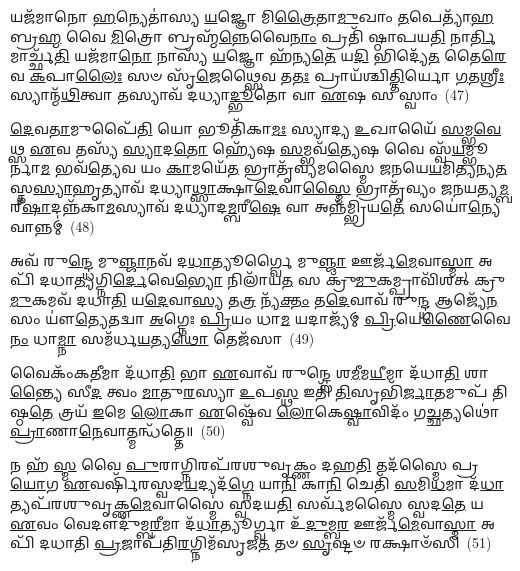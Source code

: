 𑌯𑌜᳴𑌮𑌾𑌨𑍋 \ul{𑌹}\-𑌨𑍍𑌯𑍇𑌤𑌾॑𑌸𑍍𑌯 \ul{𑌯}\-𑌜𑍍𑌞𑍋 𑌮𑌿\-\ul{𑌤𑍍𑌰𑍈}\-𑌤𑌾\-\ul{𑌮𑍁}\-𑌖𑌾𑌂 \ul{𑌤}\-𑌪𑍇𑌤𑍍𑌯𑌾᳴\-\ul{𑌹} 𑌬𑍍𑌰\-\ul{𑌹𑍍𑌮} 𑌵𑍈 \ul{𑌮𑌿}\-𑌤𑍍𑌰𑍋 𑌬𑍍𑌰𑌹𑍍𑌮᳴\-\ul{𑌨𑍍𑌨𑍇}\-𑌵𑍈\-\ul{𑌨𑌾𑌂} 𑌪𑍍𑌰𑌤𑌿᳴ 𑌷𑍍𑌠𑌾𑌪𑌯\-\ul{𑌤𑌿} 𑌨𑌾\-\ul{𑌰𑍍𑌤𑌿}\-𑌮𑌾𑌰𑍍𑌚𑍍𑌛᳴\-\ul{𑌤𑌿} 𑌯𑌜᳴𑌮𑌾\-\ul{𑌨𑍋} 𑌨𑌾𑌸𑍍𑌯᳴ \ul{𑌯}\-𑌜𑍍𑌞𑍋 𑌹᳴𑌨𑍍𑌯\-\ul{𑌤𑍇} 𑌯\-\ul{𑌦𑌿} 𑌭𑌿𑌦𑍍𑌯𑍇᳴\-\ul{𑌤} 𑌤𑍈\-\ul{𑌰𑍇}\-𑌵 \ul{𑌕}\-𑌪𑌾\-\ul{𑌲𑍈𑌃} 𑌸𑍞 𑌸𑍃᳴\-\ul{𑌜𑍇}\-𑌥𑍍𑌸𑍈𑌵 𑌤\-\ul{𑌤𑌃} 𑌪𑍍𑌰𑌾𑌯᳴𑌶𑍍𑌚𑌿\-\ul{𑌤𑍍𑌤𑌿}\-𑌰𑍍𑌯𑍋 \ul{𑌗}\-𑌤\-\ul{𑌶𑍍𑌰𑍀𑌃} 𑌸𑍍𑌯𑌾𑌨𑍍𑌮᳴\-\ul{𑌥𑌿}\-𑌤𑍍𑌵𑌾 𑌤𑌸𑍍𑌯𑌾𑌵᳴ 𑌦𑌧𑍍𑌯𑌾\-\ul{𑌦𑍍𑌭𑍂}\-𑌤𑍋 𑌵𑌾 \ul{𑌏}\-𑌷 𑌸 𑌸𑍍𑌵𑌾𑌂~(47)

\-\ul{𑌦𑍇}\-𑌵\-\ul{𑌤𑌾}\-𑌮𑍁𑌪𑍈᳴\-\ul{𑌤𑌿} 𑌯𑍋 𑌭𑍂𑌤𑌿᳴𑌕𑌾\-\ul{𑌮𑌃} 𑌸𑍍𑌯𑌾𑌦𑍍𑌯 \ul{𑌉}\-𑌖𑌾𑌯𑍈᳴ \ul{𑌸}\-𑌮𑍍𑌭\-\ul{𑌵𑍇}\-𑌥𑍍𑌸 \ul{𑌏}\-𑌵 𑌤𑌸𑍍𑌯᳴ \ul{𑌸𑍍𑌯𑌾}\-𑌦\-\ul{𑌤𑍋} 𑌹𑍍𑌯𑍇᳴𑌷 \ul{𑌸}\-𑌮𑍍𑌭𑌵᳴\-\ul{𑌤𑍍𑌯𑍇}\-𑌷 𑌵𑍈 𑌸𑍍𑌵᳴\-\ul{𑌯}\-𑌮𑍍𑌭𑍂𑌰𑍍𑌨𑌾\-\ul{𑌮} 𑌭𑌵᳴\-\ul{𑌤𑍍𑌯𑍇}\-𑌵 𑌯𑌂 \ul{𑌕𑌾}\-𑌮𑌯𑍇᳴\-\ul{𑌤} 𑌭𑍍𑌰𑌾𑌤𑍃᳴𑌵𑍍𑌯𑌮𑌸𑍍𑌮𑍈 𑌜𑌨𑌯𑍇\-\ul{𑌯}\-𑌮𑌿\-\ul{𑌤𑍍𑌯}\-𑌨𑍍𑌯\-\ul{𑌤}\-𑌸𑍍𑌤\-\ul{𑌸𑍍𑌯𑌾}\-𑌹𑍃𑌤𑍍𑌯𑌾𑌵᳴ 𑌦𑌧𑍍𑌯𑌾\-\ul{𑌥𑍍𑌸𑌾}\-𑌕𑍍𑌷𑌾\-\ul{𑌦𑍇}\-𑌵𑌾\-\ul{𑌸𑍍𑌮𑍈} 𑌭𑍍𑌰𑌾𑌤𑍃᳴𑌵𑍍𑌯𑌂 𑌜𑌨𑌯𑌤𑍍𑌯\-\ul{𑌮𑍍𑌬}\-𑌰𑍀\-\ul{𑌷𑌾}\-\-𑌦𑌨𑍍𑌨᳴𑌕𑌾\-\ul{𑌮}\-𑌸𑍍𑌯𑌾𑌵᳴ 𑌦𑌧𑍍𑌯𑌾𑌦\-\ul{𑌮𑍍𑌬}\-𑌰𑍀\-\ul{𑌷𑍇} 𑌵𑌾 𑌅𑌨𑍍𑌨᳴𑌮𑍍𑌭𑍍𑌰𑌿𑌯\-\ul{𑌤𑍇} 𑌸𑌯𑍋॑\-\ul{𑌨𑍍𑌯𑍇}\-𑌵𑌾𑌨𑍍𑌨𑌮𑍍॑~(48)

𑌅𑌵᳴ 𑌰𑍁\-\ul{𑌨𑍍𑌦𑍍𑌧𑍇} 𑌮𑍁\-\ul{𑌞𑍍𑌜𑌾}\-𑌨𑌵᳴ 𑌦\-\ul{𑌧𑌾}\-𑌤𑍍𑌯𑍂𑌰𑍍𑌗𑍍𑌵𑍈 𑌮𑍁\-\ul{𑌞𑍍𑌜𑌾} 𑌊𑌰𑍍𑌜᳴\-\ul{𑌮𑍇}\-𑌵𑌾\-\ul{𑌸𑍍𑌮𑌾} 𑌅𑌪𑌿᳴ 𑌦𑌧𑌾\-\ul{𑌤𑍍𑌯}\-𑌗𑍍𑌨𑌿\-\ul{𑌰𑍍𑌦𑍇}\-𑌵𑍇\-\ul{𑌭𑍍𑌯𑍋} 𑌨𑌿𑌲𑌾᳴𑌯\-\ul{𑌤} 𑌸 𑌕𑍍𑌰𑍁᳴\-\ul{𑌮𑍁}\-𑌕𑌮𑍍𑌪𑍍𑌰𑌾𑌵𑌿᳴𑌶𑌤𑍍 𑌕𑍍𑌰𑍁\-\ul{𑌮𑍁}\-𑌕𑌮𑌵᳴ 𑌦𑌧𑌾\-\ul{𑌤𑌿} 𑌯\-\ul{𑌦𑍇}\-𑌵𑌾\-\ul{𑌸𑍍𑌯} 𑌤\-\ul{𑌤𑍍𑌰} 𑌨𑍍𑌯᳴\-\ul{𑌕𑍍𑌤𑌂} 𑌤\-\ul{𑌦𑍇}\-𑌵𑌾𑌵᳴ 𑌰𑍁\-\ul{𑌨𑍍𑌦𑍍𑌧} 𑌆𑌜𑍍𑌯𑍇᳴\-\ul{𑌨} 𑌸𑌂 𑌯𑍗॑\-\ul{𑌤𑍍𑌯𑍇}\-𑌤𑌦𑍍𑌵𑌾 \ul{𑌅}\-𑌗𑍍𑌨𑍇𑌃 \ul{𑌪𑍍𑌰𑌿}\-𑌯𑌂 𑌧𑌾\-\ul{𑌮} 𑌯𑌦𑌾𑌜𑍍𑌯᳴𑌮𑍍 \ul{𑌪𑍍𑌰𑌿}\-𑌯𑍇\-\ul{𑌣𑍈}\-𑌵𑍈\-\ul{𑌨𑌂} 𑌧𑌾\-\ul{𑌮𑍍𑌨𑌾} 𑌸𑌮᳴𑌰𑍍𑌧\-\ul{𑌯}\-𑌤𑍍𑌯\-\ul{𑌥𑍋} 𑌤𑍇𑌜᳴𑌸𑌾~(49)

𑌵𑍈𑌕𑌂᳴𑌕\-\ul{𑌤𑍀}\-𑌮𑌾 𑌦᳴𑌧𑌾\-\ul{𑌤𑌿} 𑌭𑌾 \ul{𑌏}\-𑌵𑌾𑌵᳴ 𑌰𑍁𑌨𑍍𑌦𑍍𑌧𑍇 𑌶\-\ul{𑌮𑍀}\-𑌮\-\ul{𑌯𑍀}\-𑌮𑌾 𑌦᳴𑌧𑌾\-\ul{𑌤𑌿} 𑌶𑌾\-\ul{𑌨𑍍𑌤𑍍𑌯𑍈} 𑌸𑍀\-\ul{𑌦} 𑌤𑍍𑌵𑌂 \ul{𑌮𑌾}\-𑌤𑍁\-\ul{𑌰}\-𑌸𑍍𑌯𑌾 \ul{𑌉}\-𑌪\-\ul{𑌸𑍍𑌥} 𑌇𑌤𑌿᳴ \ul{𑌤𑌿}\-𑌸𑍃𑌭𑌿᳴\-\ul{𑌰𑍍𑌜𑌾}\-𑌤𑌮𑍁𑌪᳴ 𑌤𑌿𑌷𑍍𑌠\-\ul{𑌤𑍇} 𑌤𑍍𑌰𑌯᳴ \ul{𑌇}\-𑌮𑍇 \ul{𑌲𑍋}\-𑌕𑌾 \ul{𑌏}\-𑌷𑍍𑌵𑍇᳴𑌵 \ul{𑌲𑍋}\-𑌕𑍇\-\ul{𑌷𑍍𑌵𑌾}\-𑌵𑌿𑌦𑌂᳴ 𑌗\-\ul{𑌚𑍍𑌛}\-𑌤𑍍𑌯𑌥𑍋॑ \ul{𑌪𑍍𑌰𑌾}\-𑌣𑌾\-\ul{𑌨𑍇}\-𑌵𑌾𑌤𑍍𑌮𑌨𑍍𑌧᳴𑌤𑍍𑌤𑍇॥~(50)

{}%

𑌨 𑌹᳴ \ul{𑌸𑍍𑌮} 𑌵𑍈 \ul{𑌪𑍁}\-𑌰𑌾𑌗𑍍𑌨𑌿𑌰𑌪᳴𑌰𑌶𑍁𑌵𑍃𑌕𑍍𑌣𑌂 𑌦𑌹\-\ul{𑌤𑌿} 𑌤𑌦᳴𑌸𑍍𑌮𑍈 𑌪𑍍𑌰\-\ul{𑌯𑍋}\-𑌗 \ul{𑌏}\-𑌵𑌰𑍍\mbox{}𑌷𑌿᳴𑌰𑌸𑍍𑌵𑌦\-\ul{𑌯}\-𑌦𑍍𑌯𑌦᳴\-\ul{𑌗𑍍𑌨𑍇} 𑌯𑌾\-\ul{𑌨𑌿} 𑌕𑌾\-\ul{𑌨𑌿} 𑌚𑍇𑌤𑌿᳴ \ul{𑌸}\-𑌮𑌿\-\ul{𑌧}\-𑌮𑌾 𑌦᳴\-\ul{𑌧𑌾}\-𑌤𑍍𑌯𑌪᳴𑌰𑌶𑍁𑌵𑍃𑌕𑍍𑌣\-\ul{𑌮𑍇}\-𑌵𑌾𑌸𑍍𑌮𑍈॑ 𑌸𑍍𑌵𑌦𑌯\-\ul{𑌤𑌿} 𑌸𑌰𑍍𑌵᳴𑌮𑌸𑍍𑌮𑍈 𑌸𑍍𑌵𑌦\-\ul{𑌤𑍇} 𑌯 \ul{𑌏}\-𑌵𑌂 𑌵𑍇𑌦𑍗𑌦𑍁᳴𑌮𑍍𑌬\-\ul{𑌰𑍀}\-𑌮𑌾 𑌦᳴\-\ul{𑌧𑌾}\-𑌤𑍍𑌯𑍂𑌰𑍍𑌗𑍍𑌵𑌾 𑌉᳴\-\ul{𑌦𑍁}\-𑌮𑍍𑌬\-\ul{𑌰} 𑌊𑌰𑍍𑌜᳴\-\ul{𑌮𑍇}\-𑌵𑌾\-\ul{𑌸𑍍𑌮𑌾} 𑌅𑌪𑌿᳴ 𑌦𑌧𑌾𑌤𑌿 \ul{𑌪𑍍𑌰}\-𑌜𑌾𑌪᳴𑌤𑌿\-\ul{𑌰}\-𑌗𑍍𑌨𑌿𑌮᳴𑌸𑍃𑌜\-\ul{𑌤} 𑌤𑍞 \ul{𑌸𑍃}\-𑌷𑍍𑌟𑍞 𑌰𑌕𑍍𑌷𑌾𑍞᳴𑌸𑌿~(51)

